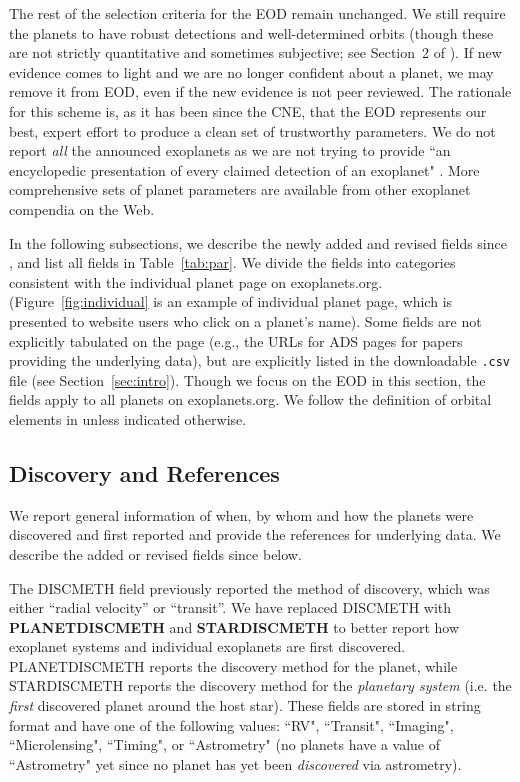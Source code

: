\documentclass[11pt,preprint]{aastex}
\begin{document}
\begin{CJK*}{UTF8}{gbsn}
The rest of the selection criteria for the EOD remain unchanged. We
still require the planets to have robust detections and
well-determined orbits (though these are not strictly quantitative and
sometimes subjective; see Section~2 of \citealt{Wright2011}). If new
evidence comes to light and we are no longer confident about a planet,
we may remove it from EOD, even if the new evidence is not peer
reviewed.  The rationale for this scheme is, as it has been since the
CNE, that the EOD represents our best, expert effort to produce a
clean set of trustworthy parameters.  We do not report \textit{all}
the announced exoplanets as we are not trying to provide ``an
encyclopedic presentation of every claimed detection of an exoplanet"
\citep{Wright2011}.  More comprehensive sets of planet parameters are
available from other exoplanet compendia on the Web.

In the following subsections, we describe the newly added and revised
fields since \cite{Wright2011}, and list all fields in
Table~\ref{tab:par}. We divide the fields into categories consistent
with the individual planet page on
exoplanets.org. (Figure~\ref{fig:individual} is an example of
individual planet page, which is presented to website users who click
on a planet's name). Some fields are not explicitly tabulated on the
page (e.g., the URLs for ADS pages for papers providing the underlying
data), but are explicitly listed in the downloadable {\tt .csv} file
(see Section~\ref{sec:intro}). Though we focus on the EOD in this
section, the fields apply to all planets on exoplanets.org. We follow
the definition of orbital elements in \cite{Wright2013} unless
indicated otherwise.


\subsection{Discovery and References}\label{sec:disc}

We report general information of when, by whom and how the planets
were discovered and first reported and provide the references for
underlying data. We describe the added or revised fields since
\cite{Wright2011} below.

The DISCMETH field previously reported the method of discovery,
which was either ``radial velocity'' or ``transit''. We have replaced DISCMETH
with {\bf PLANETDISCMETH} and {\bf STARDISCMETH} to better
report how exoplanet systems and individual exoplanets are first
discovered. PLANETDISCMETH reports the discovery method for the
planet, while STARDISCMETH reports the discovery method for the {\it
  planetary system} (i.e. the {\it first}
discovered planet around the host star). These fields are stored
in string format and have one of the following values: ``RV",
``Transit", ``Imaging", ``Microlensing", ``Timing", or ``Astrometry"
(no planets have a value of ``Astrometry" yet since no planet has yet
been {\it discovered} via astrometry).


\end{CJK*}
\end{document}
